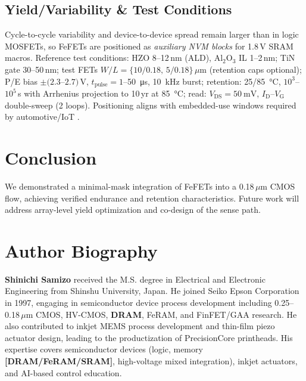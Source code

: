 \documentclass[journal]{IEEEtran}
\begin{document}
\subsection*{Yield/Variability \& Test Conditions}
Cycle-to-cycle variability and device-to-device spread remain larger than in logic MOSFETs, so FeFETs are positioned as \emph{auxiliary NVM blocks} for 1.8\,V SRAM macros. Reference test conditions: HZO 8--12\,nm (ALD), Al$_2$O$_3$ IL 1--2\,nm; TiN gate 30--50\,nm; test FETs $W/L=\{10/0.18,\,5/0.18\}\,\mu$m (retention caps optional); P/E bias $\pm(2.3$--$2.7)$\,V, $t_\mathrm{pulse}=1$--\SI{50}{\micro\second}, \SI{10}{\kilo\hertz} burst; retention: 25/\SI{85}{\celsius}, $10^3$--$10^5$\,s with Arrhenius projection to 10\,yr at \SI{85}{\celsius}; read: $V_\mathrm{DS}=\SI{50}{\milli\volt}$, $I_\mathrm{D}$--$V_\mathrm{G}$ double-sweep (2 loops). Positioning aligns with embedded-use windows required by automotive/IoT \cite{Polakowski2014,Nakamura2003}.

\section{Conclusion}
We demonstrated a minimal-mask integration of FeFETs into a 0.18\,$\mu$m CMOS flow, achieving verified endurance and retention characteristics. Future work will address array-level yield optimization and co-design of the sense path.




\section*{Author Biography}
\noindent\textbf{Shinichi Samizo} received the M.S. degree in Electrical and Electronic Engineering from Shinshu University, Japan. He joined Seiko Epson Corporation in 1997, engaging in semiconductor device process development including 0.25--0.18\,$\mu$m CMOS, HV-CMOS, \textbf{DRAM}, FeRAM, and FinFET/GAA research. He also contributed to inkjet MEMS process development and thin-film piezo actuator design, leading to the productization of PrecisionCore printheads. His expertise covers semiconductor devices (logic, memory \textbf{[DRAM/FeRAM/SRAM]}, high-voltage mixed integration), inkjet actuators, and AI-based control education.
\end{document}
